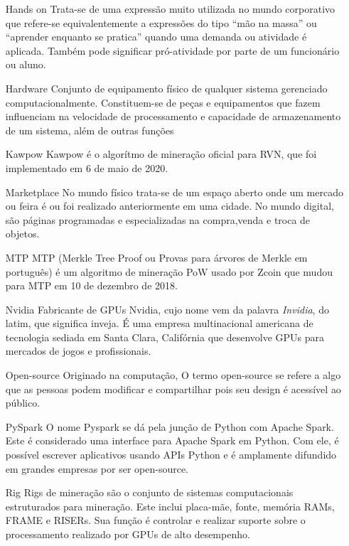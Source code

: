 \begin{center}
\begin{itemize}
		\item[Hands on] Trata-se de uma expressão muito utilizada no mundo corporativo que refere-se equivalentemente a expressões do tipo ``mão na massa'' ou ``aprender enquanto se pratica'' quando uma demanda ou atividade é aplicada. Também pode significar pró-atividade por parte de um funcionário ou aluno.
		
		\item[Hardware] Conjunto de equipamento físico de qualquer sistema gerenciado computacionalmente. Constituem-se de peças e equipamentos que fazem influenciam na velocidade de processamento e capacidade de armazenamento de um sistema, além de outras funções
		
		\item[Kawpow] Kawpow é o algorítmo de mineração oficial para RVN, que foi implementado em 6 de maio de 2020.
		
		\item[Marketplace] No mundo físico trata-se de um espaço aberto onde um mercado ou feira é ou foi realizado anteriormente em uma cidade. No mundo digital, são páginas programadas e especializadas na compra,venda e troca de objetos.
		
		\item[MTP] MTP (Merkle Tree Proof ou Provas para árvores de Merkle em português) é um algoritmo de mineração PoW usado por Zcoin que mudou para MTP em 10 de dezembro de 2018.
		
		\item[Nvidia] Fabricante de GPUs Nvidia, cujo nome vem da palavra \textit{Invidia}, do latim, que significa inveja. É uma empresa multinacional americana de tecnologia sediada em Santa Clara, Califórnia que desenvolve GPUs para mercados de jogos e profissionais.
		
		\item[Open-source] Originado na computação, 
		O termo open-source se refere a algo que as pessoas podem modificar e compartilhar pois seu design é acessível ao público.
				
		\item[PySpark]  O nome Pyspark se dá pela junção de Python com Apache Spark. Este é considerado uma interface para Apache Spark em Python. Com ele, é possível escrever aplicativos usando APIs Python e é amplamente difundido em grandes empresas por ser open-source.
		
		\item[Rig] Rigs de mineração são o conjunto de sistemas computacionais estruturados para mineração. Este inclui placa-mãe, fonte, memória RAMs, FRAME e RISERs. Sua função é controlar e realizar suporte sobre o processamento realizado por GPUs de alto desempenho.
		

\end{itemize}
\end{center}
